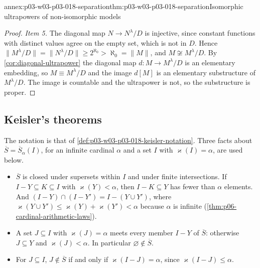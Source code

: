 \begin{annexitem}{annex:p03-w03-p03-018-separation}{thm:p03-w03-p03-018-separation}{Isomorphic ultrapowers of non-isomorphic models}
\begin{proof}
\emph{Item 5.}  The diagonal map \(N\to N^\lambda/D\) is injective, since
constant functions with distinct values agree on the empty set, which is not
in \(D\).  Hence
\(\lVert M^\lambda/D\rVert=\lVert N^\lambda/D\rVert\ge2^{\aleph_0}>\aleph_0=\lVert M\rVert\),
and
\(M\not\cong M^\lambda/D\).  By \cref{cor:diagonal-ultrapower} the diagonal
map \(d:M\to M^\lambda/D\) is an elementary embedding, so
\(M\equiv M^\lambda/D\) and the image \(d[M]\) is an elementary substructure
of \(M^\lambda/D\).  The image is countable and the ultrapower is not, so the
substructure is proper.
\end{proof}
\end{annexitem}

\subsection*{Keisler's theorems}

The notation is that of \cref{def:p03-w03-p03-018-keisler-notation}.  Three
facts about \(\overline S=\overline S_\alpha(I)\), for an infinite cardinal
\(\alpha\) and a set \(I\) with \(\varkappa(I)=\alpha\), are used below.
\begin{itemize}
  \item[(F1)] \(\overline S\) is closed under supersets within \(I\) and
        under finite intersections.  If \(I-Y\subseteq K\subseteq I\) with
        \(\varkappa(Y)<\alpha\), then \(I-K\subseteq Y\) has fewer than
        \(\alpha\) elements.  And \((I-Y)\cap(I-Y')=I-(Y\cup Y')\), where
        \(\varkappa(Y\cup Y')\le\varkappa(Y)+\varkappa(Y')<\alpha\) because
        \(\alpha\) is infinite (\cref{thm:p06-cardinal-arithmetic-laws}).
  \item[(F2)] A set \(J\subseteq I\) with \(\varkappa(J)=\alpha\) meets every
        member \(I-Y\) of \(\overline S\): otherwise \(J\subseteq Y\) and
        \(\varkappa(J)<\alpha\).  In particular \(\varnothing\notin\overline S\).
  \item[(F3)] For \(J\subseteq I\), \(J\notin\overline S\) if and only if
        \(\varkappa(I-J)=\alpha\), since \(\varkappa(I-J)\le\alpha\).
\end{itemize}

